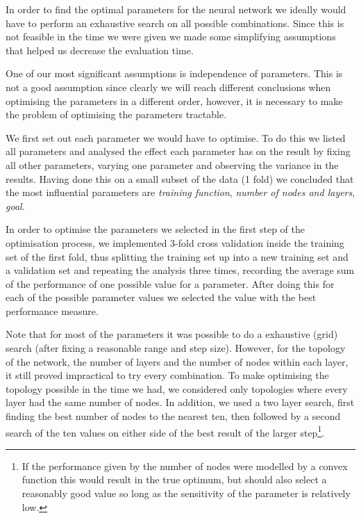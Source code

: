 \documentclass[10pt,a4paper]{article}
\begin{document}
In order to find the optimal parameters for the neural network we ideally would have to perform an exhaustive search on all possible combinations. Since this is not feasible in the time we were given we made some simplifying assumptions that helped us decrease the evaluation time.

One of our most significant assumptions is independence of parameters. This is not a good assumption since clearly we will reach different conclusions when optimising the parameters in a different order, however, it is necessary to make the problem of optimising the parameters tractable.

We first set out each parameter we would have to optimise. To do this we listed all parameters and analysed the effect each parameter has on the result by fixing all other parameters, varying one parameter and observing the variance in the results. Having done this on a small subset of the data (1 fold) we concluded that the most influential parameters are \emph{training function}, \emph{number of nodes and layers}, \emph{goal}. %

In order to optimise the parameters we selected in the first step of the optimisation process, we implemented 3-fold cross validation inside the training set of the first fold, thus splitting the training set up into a new training set and a validation set and repeating the analysis three times, recording the average sum of the performance of one possible value for a parameter. After doing this for each of the possible parameter values we selected the value with the best performance measure.

Note that for most of the parameters it was possible to do a exhaustive (grid) search (after fixing a reasonable range and step size). However, for the topology of the network, the number of layers and the number of nodes within each layer, it still proved impractical to try every combination. To make optimising the topology possible in the time we had, we considered only topologies where every layer had the same number of nodes. In addition, we used a two layer search, first finding the best number of nodes to the nearest ten, then followed by a second search of the ten values on either side of the best result of the larger step\footnote{If the performance given by the number of nodes were modelled by a convex function this would result in the true optimum, but should also select a reasonably good value so long as the sensitivity of the parameter is relatively low.}.
\end{document}
